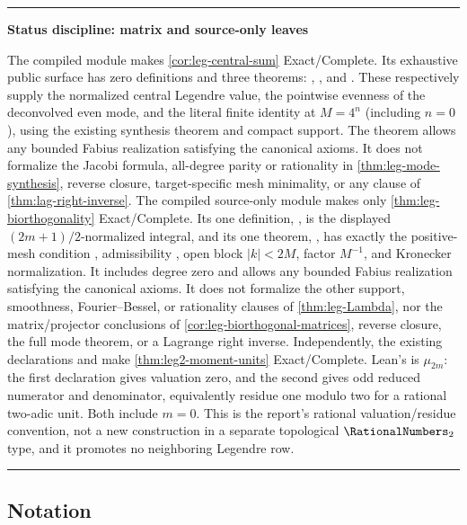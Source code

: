 \documentclass[11pt,oneside]{article}
\numberwithin{equation}{section}
\theoremstyle{definition}
\theoremstyle{remark}
\newenvironment{statusbox}[1]{%
  \par\smallskip\noindent\begin{center}\begin{minipage}{0.94\textwidth}%
  \hrule\vspace{0.5em}\noindent\textbf{#1}\par\smallskip
}{%
  \vspace{0.5em}\hrule\end{minipage}\end{center}\smallskip
}
\begin{document}
\begin{statusbox}{Status discipline: matrix and source-only leaves}
The compiled module  makes
\cref{cor:leg-central-sum} Exact/Complete.  Its exhaustive public surface has
zero definitions and three theorems:
,
, and
.  These respectively supply the normalized
central Legendre value, the pointwise evenness of the deconvolved even mode,
and the literal finite identity at $M=4^n$ (including $n=0$), using the
existing synthesis theorem and compact support.  The theorem allows any
bounded Fabius realization satisfying the canonical axioms.  It does not
formalize the Jacobi formula, all-degree parity or rationality in
\cref{thm:leg-mode-synthesis}, reverse closure, target-specific mesh
minimality, or any clause of \cref{thm:lag-right-inverse}.
The compiled source-only module
 makes only
\cref{thm:leg-biorthogonality} Exact/Complete.  Its one definition,
, is the displayed
$(2m+1)/2$-normalized integral, and its one theorem,
, has exactly the positive-mesh condition
, admissibility , open block
$\lvert k\rvert<2M$, factor $M^{-1}$, and Kronecker normalization.  It
includes degree zero and allows any bounded Fabius realization satisfying the
canonical axioms.  It does not formalize the other support, smoothness,
Fourier--Bessel, or rationality clauses of \cref{thm:leg-Lambda}, nor the
matrix/projector conclusions of \cref{cor:leg-biorthogonal-matrices}, reverse
closure, the full mode theorem, or a Lagrange right inverse.
Independently, the existing  declarations
 and  make
\cref{thm:leg2-moment-units} Exact/Complete.  Lean's  is
$\mu_{2m}$: the first declaration gives valuation zero, and the second gives
odd reduced numerator and denominator, equivalently residue one modulo two
for a rational two-adic unit.  Both include $m=0$.  This is the report's
rational valuation/residue convention, not a new construction in a separate
topological $\RationalNumbers_2$ type, and it promotes no neighboring Legendre row.
\end{statusbox}

\subsection*{Notation}
\end{document}
